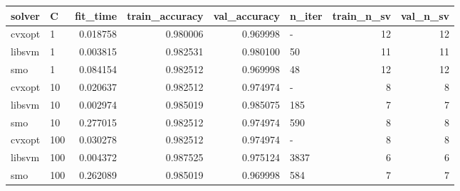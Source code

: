 \begin{tabular}{llrrrlrr}
\toprule
solver &   C &  fit\_time &  train\_accuracy &  val\_accuracy & n\_iter &  train\_n\_sv &  val\_n\_sv \\
\midrule
cvxopt &   1 &  0.018758 &        0.980006 &      0.969998 &      - &          12 &        12 \\
libsvm &   1 &  0.003815 &        0.982531 &      0.980100 &     50 &          11 &        11 \\
   smo &   1 &  0.084154 &        0.982512 &      0.969998 &     48 &          12 &        12 \\
cvxopt &  10 &  0.020637 &        0.982512 &      0.974974 &      - &           8 &         8 \\
libsvm &  10 &  0.002974 &        0.985019 &      0.985075 &    185 &           7 &         7 \\
   smo &  10 &  0.277015 &        0.982512 &      0.974974 &    590 &           8 &         8 \\
cvxopt & 100 &  0.030278 &        0.982512 &      0.974974 &      - &           8 &         8 \\
libsvm & 100 &  0.004372 &        0.987525 &      0.975124 &   3837 &           6 &         6 \\
   smo & 100 &  0.262089 &        0.985019 &      0.969998 &    584 &           7 &         7 \\
\bottomrule
\end{tabular}
